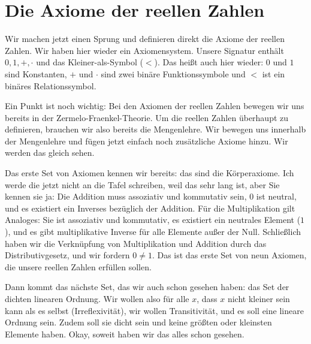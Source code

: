 \section{Die Axiome der reellen Zahlen}

\begin{spoken-clean}[00:13:30 - 00:15:45]
Wir machen jetzt einen Sprung und definieren direkt die Axiome der reellen Zahlen. Wir haben hier wieder ein Axiomensystem. Unsere Signatur enthält $0, 1, +, \cdot$ und das Kleiner-als-Symbol ($<$). Das heißt auch hier wieder: $0$ und $1$ sind Konstanten, $+$ und $\cdot$ sind zwei binäre Funktionssymbole und $<$ ist ein binäres Relationssymbol.

Ein Punkt ist noch wichtig: Bei den Axiomen der reellen Zahlen bewegen wir uns bereits in der Zermelo-Fraenkel-Theorie. Um die reellen Zahlen überhaupt zu definieren, brauchen wir also bereits die Mengenlehre. Wir bewegen uns innerhalb der Mengenlehre und fügen jetzt einfach noch zusätzliche Axiome hinzu. Wir werden das gleich sehen.

Das erste Set von Axiomen kennen wir bereits: das sind die Körperaxiome. Ich werde die jetzt nicht an die Tafel schreiben, weil das sehr lang ist, aber Sie kennen sie ja: Die Addition muss assoziativ und kommutativ sein, $0$ ist neutral, und es existiert ein Inverses bezüglich der Addition. Für die Multiplikation gilt Analoges: Sie ist assoziativ und kommutativ, es existiert ein neutrales Element ($1$), und es gibt multiplikative Inverse für alle Elemente außer der Null. Schließlich haben wir die Verknüpfung von Multiplikation und Addition durch das Distributivgesetz, und wir fordern $0 \neq 1$. Das ist das erste Set von neun Axiomen, die unsere reellen Zahlen erfüllen sollen.

Dann kommt das nächste Set, das wir auch schon gesehen haben: das Set der dichten linearen Ordnung. Wir wollen also für alle $x$, dass $x$ nicht kleiner sein kann als es selbst (Irreflexivität), wir wollen Transitivität, und es soll eine lineare Ordnung sein. Zudem soll sie dicht sein und keine größten oder kleinsten Elemente haben. Okay, soweit haben wir das alles schon gesehen.
\end{spoken-clean}

